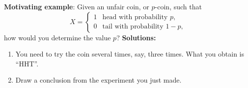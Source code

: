 \begin{frame}

 {\bf\noindent Motivating example}: Given an unfair coin, or $p$-coin, such that
 \[
 X=
 \begin{cases}
    1 & \text{head with probability $p$},\\
    0 & \text{tail with probability $1-p$,}
 \end{cases}
 \]
 how would you determine the value $p$?
 \vfill
{\bf Solutions:~}
 \begin{enumerate}
  \item You need to try the coin several times, say, three times. What you obtain is ``HHT''.
  \item Draw a conclusion from the experiment you just made.
 \end{enumerate}

 \end{frame}


